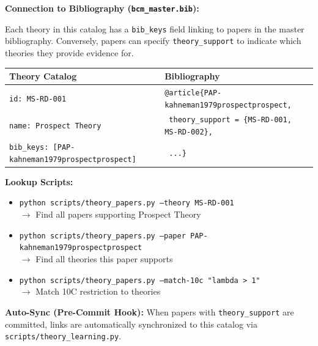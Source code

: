 \begin{tcolorbox}[colback=yellow!5!white, colframe=yellow!60!black,
    title=\textbf{Bidirectional Paper Integration}]

\textbf{Connection to Bibliography (\texttt{bcm\_master.bib}):}

Each theory in this catalog has a \texttt{bib\_keys} field linking to papers in the
master bibliography. Conversely, papers can specify \texttt{theory\_support} to
indicate which theories they provide evidence for.

\begin{center}
\begin{tabular}{|l|l|}
\hline
\textbf{Theory Catalog} & \textbf{Bibliography} \\
\hline
\texttt{id: MS-RD-001} & \texttt{@article\{PAP-kahneman1979prospectprospect,} \\
\texttt{name: Prospect Theory} & \texttt{  theory\_support = \{MS-RD-001, MS-RD-002\},} \\
\texttt{bib\_keys: [PAP-kahneman1979prospectprospect]} & \texttt{  ...\}} \\
\hline
\end{tabular}
\end{center}

\textbf{Lookup Scripts:}
\begin{itemize}[nosep]
    \item \texttt{python scripts/theory\_papers.py --theory MS-RD-001} \\
          $\rightarrow$ Find all papers supporting Prospect Theory
    \item \texttt{python scripts/theory\_papers.py --paper PAP-kahneman1979prospectprospect} \\
          $\rightarrow$ Find all theories this paper supports
    \item \texttt{python scripts/theory\_papers.py --match-10c "lambda > 1"} \\
          $\rightarrow$ Match 10C restriction to theories
\end{itemize}

\textbf{Auto-Sync (Pre-Commit Hook):}
When papers with \texttt{theory\_support} are committed, links are automatically
synchronized to this catalog via \texttt{scripts/theory\_learning.py}.

\end{tcolorbox}

